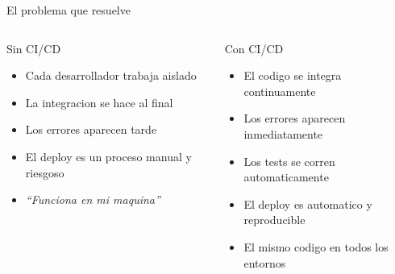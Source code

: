 \documentclass[aspectratio=169]{beamer}
\begin{document}
\begin{frame}{El problema que resuelve}
  \begin{columns}
    \begin{alertblock}{Sin CI/CD}
      \begin{itemize}
        \item Cada desarrollador trabaja aislado
        \item La integracion se hace al final
        \item Los errores aparecen tarde
        \item El deploy es un proceso manual y riesgoso
        \item \textit{``Funciona en mi maquina''}
      \end{itemize}
    \end{alertblock}

    \begin{exampleblock}{Con CI/CD}
      \begin{itemize}
        \item El codigo se integra continuamente
        \item Los errores aparecen inmediatamente
        \item Los tests se corren automaticamente
        \item El deploy es automatico y reproducible
        \item El mismo codigo en todos los entornos
      \end{itemize}
    \end{exampleblock}
  \end{columns}
\end{frame}
\end{document}
